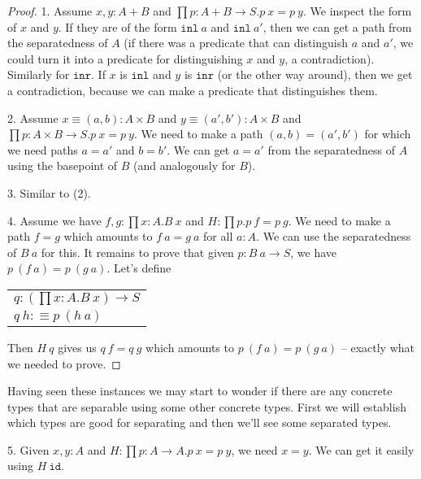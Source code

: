 \documentclass[11pt]{article}
\theoremstyle{definition}
\newcommand{\txt}[1]{\texttt{#1}}
\newcommand{\text}[1]{\texttt{#1}}
\renewcommand{\(}{\left(}
\renewcommand{\)}{\right)}
\newcommand{\defn}{:\equiv}
\newcommand{\apl}[2]{#1\ #2}
\newcommand{\id}{\text{id}}
\newcommand{\dprod}[2]{\prod #1.#2}
\newcommand{\prodt}[2]{#1 \times #2}
\newcommand{\inl}{\txt{inl}}
\newcommand{\inr}{\txt{inr}}
\begin{document}
\begin{proof}
1. Assume $x, y : A + B$ and $\dprod{p : A + B \to S}{\apl{p}{x} = \apl{p}{y}}$. We inspect the form of $x$ and $y$. If they are of the form $\apl{\inl}{a}$ and $\apl{\inl}{a'}$, then we can get a path from the separatedness of $A$ (if there was a predicate that can distinguish $a$ and $a'$, we could turn it into a predicate for distinguishing $x$ and $y$, a contradiction). Similarly for $\inr$. If $x$ is $\inl$ and $y$ is $\inr$ (or the other way around), then we get a contradiction, because we can make a predicate that distinguishes them.

2. Assume $x \equiv (a, b) : \prodt{A}{B}$ and $y \equiv (a', b') : \prodt{A}{B}$ and $\dprod{p : \prodt{A}{B} \to S}{\apl{p}{x} = \apl{p}{y}}$. We need to make a path $(a, b) = (a', b')$ for which we need paths $a = a'$ and $b = b'$. We can get $a = a'$ from the separatedness of $A$ using the basepoint of $B$ (and analogously for $B$).

3. Similar to (2).

4. Assume we have $f, g : \dprod{x : A}{\apl{B}{x}}$ and $H : \dprod{p}{\apl{p}{f} = \apl{p}{g}}$. We need to make a path $f = g$ which amounts to $\apl{f}{a} = \apl{g}{a}$ for all $a : A$. We can use the separatedness of $\apl{B}{a}$ for this. It remains to prove that given $p : \apl{B}{a} \to S$, we have $\apl{p}{(\apl{f}{a})} = \apl{p}{(\apl{g}{a})}$. Let's define \\

\begin{center}
\begin{tabular}{l}
$q : \(\dprod{x : A}{\apl{B}{x}}\) \to S$ \\
$\apl{q}{h} \defn \apl{p}{(\apl{h}{a})}$
\end{tabular}
\end{center}

Then $\apl{H}{q}$ gives us $\apl{q}{f} = \apl{q}{g}$ which amounts to $\apl{p}{(\apl{f}{a})} = \apl{p}{(\apl{g}{a})}$ -- exactly what we needed to prove.
\end{proof}

Having seen these instances we may start to wonder if there are any concrete types that are separable using some other concrete types. First we will establish which types are good for separating and then we'll see some separated types.

5. Given $x, y : A$ and $H : \dprod{p : A \to A}{\apl{p}{x} = \apl{p}{y}}$, we need $x = y$. We can get it easily using $\apl{H}{\id}$.
\end{document}
